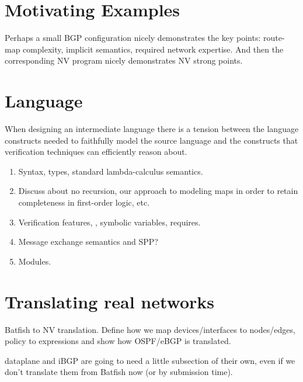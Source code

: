 \documentclass[sigconf,10pt]{acmart}
\begin{document}
\section{Motivating Examples} 
\label{sec:motivation}

Perhaps a small BGP configuration nicely demonstrates the key points: route-map complexity, implicit semantics, required network expertise.
And then the corresponding NV program nicely demonstrates NV strong points.

%
%
%
%

\section{Language} 
\label{sec:language}

When designing an intermediate language there is a tension between the language
constructs needed to faithfully model the source language and the constructs
that verification techniques can efficiently reason about.
\begin{enumerate}
  \item Syntax, types, standard lambda-calculus semantics.
  \item Discuss about no recursion, our approach to modeling maps in order to retain completeness in first-order logic, etc.
  \item Verification features, \EG, symbolic variables, requires.
  \item Message exchange semantics and SPP?
  \item Modules.
\end{enumerate}

%
%
%
%

\section{Translating real networks}
\label{sec:translation}

Batfish to NV translation. Define how we map devices/interfaces to nodes/edges,
policy to expressions and show how OSPF/eBGP is translated.

dataplane and iBGP are going to need a little subsection of their own, even if we don't translate them from Batfish now (or by submission time).
\end{document}
